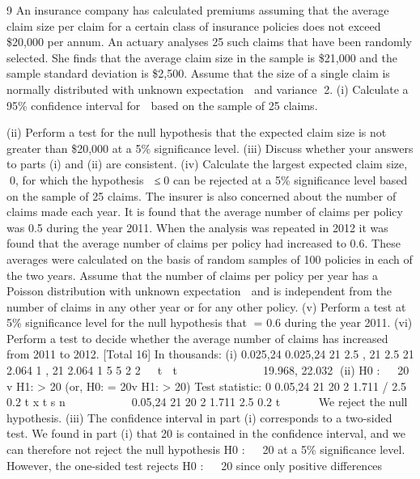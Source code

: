 \documentclass[a4paper,12pt]{article}
\begin{document}
\begin{enumerate}


9 An insurance company has calculated premiums assuming that the average claim size per claim for a certain class of insurance policies does not exceed \$20,000 per annum.
An actuary analyses 25 such claims that have been randomly selected. She finds that the average claim size in the sample is \$21,000 and the sample standard deviation is
\$2,500. Assume that the size of a single claim is normally distributed with unknown expectation  and variance 2.
(i) Calculate a 95\%  confidence interval for  based on the sample of 25 claims.

(ii) Perform a test for the null hypothesis that the expected claim size is not greater
than \$20,000 at a 5\% significance level. 
(iii) Discuss whether your answers to parts (i) and (ii) are consistent. 
(iv) Calculate the largest expected claim size, 0, for which the hypothesis  ≤0
can be rejected at a 5\% significance level based on the sample of 25 claims. 
The insurer is also concerned about the number of claims made each year. It is found that the average number of claims per policy was 0.5 during the year 2011. When the
analysis was repeated in 2012 it was found that the average number of claims per policy had increased to 0.6. These averages were calculated on the basis of random
samples of 100 policies in each of the two years. Assume that the number of claims per policy per year has a Poisson distribution with unknown expectation  and is
independent from the number of claims in any other year or for any other policy. 
(v) Perform a test at 5\% significance level for the null hypothesis that = 0.6
during the year 2011. 
(vi) Perform a test to decide whether the average number of claims has increased
from 2011 to 2012. 
[Total 16]
 In thousands:
  (i) 0.025,24 0.025,24
21 2.5 , 21 2.5 21 2.064 1 , 21 2.064 1
5 5 2 2
 t  t          
19.968, 22.032
(ii) H0 :   20 v H1: \alpha > 20
(or, H0: \alpha = 20v H1: \alpha > 20)
Test statistic: 0
0.05,24
21 20 2 1.711
/ 2.5 0.2
t x t
s n
  
    

0.05,24
21 20 2 1.711
2.5 0.2
t

  

We reject the null hypothesis.
(iii) The confidence interval in part (i) corresponds to a two-sided test. We found
in part (i) that 20 is contained in the confidence interval, and we can therefore
not reject the null hypothesis H0 :   20 at a 5\% significance level.
However, the one-sided test rejects H0 :   20 since only positive differences

\end{enumerate}
\end{document}
